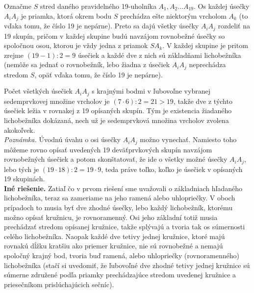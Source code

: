\rieh Označme $S$ stred daného pravidelného 19-uholníka $A_ 1, A_2 \ldots A_{19}$. Os každej úsečky $A_iA_j$ je priamka, ktorá okrem bodu $S$ prechádza ešte niektorým vrcholom $A_k$ (to vďaka tomu, že číslo 19 je nepárne). Preto sa dajú všetky úsečky $A_ iA_j$ rozdeliť na 19 skupín, pričom v každej skupine budú navzájom rovnobežné úsečky so spoločnou osou, ktorou je vždy jedna z priamok $SA_ k$. V každej skupine je pritom zrejme $(19 -1) : 2 = 9$ úsečiek a každé dve z nich sú základňami lichobežníka (nemôže sa jednať o rovnobežník, lebo žiadna z úsečiek $A_iA_j$ neprechádza stredom $S$, opäť vďaka tomu, že číslo 19 je nepárne).

Počet všetkých úsečiek $A_iA_j$ s krajnými bodmi v ľubovoľne vybranej sedemprvkovej množine vrcholov je $(7 \cdot 6) : 2 = 21 > 19$, takže dve z týchto úsečiek ležia v rovnakej z 19 opísaných skupín. Tým je existencia žiadaného lichobežníka dokázaná, nech už je sedemprvková množina vrcholov zvolena akokoľvek.\\
\textit{Poznámka.} Úvodnú úvahu o osi úsečky $A_iA_j$ možno vynechať. Namiesto toho môžeme rovno opísať uvedených 19 deväťprvkových skupín navzájom rovnobežných úsečiek a potom skonštatovať, že ide o všetky možné úsečky $A_iA_j$, lebo tých je $(19 \cdot 18) : 2 = 19 \cdot 9$, teda práve toľko, koľko je úsečiek v opísaných 19 skupinách.\\
\textbf{Iné riešenie.} Zatiaľ čo v prvom riešení sme uvažovali o základniach hľadaného lichobežníka, teraz sa zameriame na jeho ramená alebo uhlopriečky. V oboch prípadoch to musia byť dve zhodné úsečky, lebo každý lichobežník, ktorému možno opísať kružnicu, je rovnoramenný. Osi jeho základní totiž musia prechádzať stredom opísanej kružnice, takže splývajú a tvoria tak os súmernosti celého lichobežníka. Naopak každé dve tetivy jednej kružnice, ktoré majú rovnakú dĺžku kratšiu ako priemer kružnice, nie sú rovnobežné a nemajú spoločný krajný bod, tvoria buď ramená, alebo uhlopriečky (rovnoramenného) lichobežníka (stačí si uvedomiť, že ľubovoľné dve zhodné tetivy jednej kružnice sú súmerne združené podľa priamky prechádzajúce stredom uvedenej kružnice a priesečníkom prislúchajúcich sečníc).

